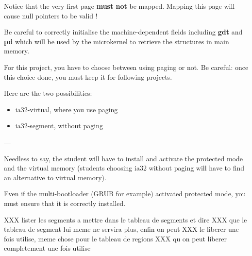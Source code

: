 Notice that the  very first page \textbf{must not}  be mapped. Mapping
this page will cause null pointers to be valid !

Be careful to correctly initialise the machine-dependent fields
including \textbf{gdt} and \textbf{pd} which will be used by the microkernel
to retrieve the structures in main memory.

For this project,  you have to choose between using  paging or not. Be
careful:  once  this choice  done,  you  must  keep it  for  following
projects.

Here are the two possibilities:

\begin{itemize}
\item ia32-virtual, where you use paging
\item ia32-segment, without paging
\end{itemize}

---

Needless to  say, the  student will have  to install and  activate the
protected mode and the  virtual memory (students choosing ia32 without
paging will have to find an alternative to virtual memory).

Even if  the multi-bootloader  (GRUB for example)  activated protected
mode, you must ensure that it is correctly installed.

XXX lister les segments a mettre dans le tableau de segments et dire
XXX que le tableau de segment lui meme ne servira plus, enfin on peut
XXX le liberer une fois utilise, meme chose pour le tableau de regions
XXX qu on peut liberer completement une fois utilise

